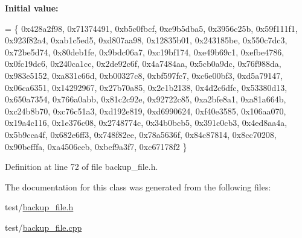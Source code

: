 {\bfseries Initial value\+:}
\begin{DoxyCode}
=
          \{
            0x428a2f98, 0x71374491, 0xb5c0fbcf, 0xe9b5dba5,
            0x3956c25b, 0x59f111f1, 0x923f82a4, 0xab1c5ed5,
            0xd807aa98, 0x12835b01, 0x243185be, 0x550c7dc3,
            0x72be5d74, 0x80deb1fe, 0x9bdc06a7, 0xc19bf174,
            0xe49b69c1, 0xefbe4786, 0x0fc19dc6, 0x240ca1cc,
            0x2de92c6f, 0x4a7484aa, 0x5cb0a9dc, 0x76f988da,
            0x983e5152, 0xa831c66d, 0xb00327c8, 0xbf597fc7,
            0xc6e00bf3, 0xd5a79147, 0x06ca6351, 0x14292967,
            0x27b70a85, 0x2e1b2138, 0x4d2c6dfc, 0x53380d13,
            0x650a7354, 0x766a0abb, 0x81c2c92e, 0x92722c85,
            0xa2bfe8a1, 0xa81a664b, 0xc24b8b70, 0xc76c51a3,
            0xd192e819, 0xd6990624, 0xf40e3585, 0x106aa070,
            0x19a4c116, 0x1e376c08, 0x2748774c, 0x34b0bcb5,
            0x391c0cb3, 0x4ed8aa4a, 0x5b9cca4f, 0x682e6ff3,
            0x748f82ee, 0x78a5636f, 0x84c87814, 0x8cc70208,
            0x90befffa, 0xa4506ceb, 0xbef9a3f7, 0xc67178f2
          \}
\end{DoxyCode}


Definition at line 72 of file backup\+\_\+file.\+h.



The documentation for this class was generated from the following files\+:\begin{DoxyCompactItemize}
\item 
test/\hyperlink{backup__file_8h}{backup\+\_\+file.\+h}\item 
test/\hyperlink{backup__file_8cpp}{backup\+\_\+file.\+cpp}\end{DoxyCompactItemize}

